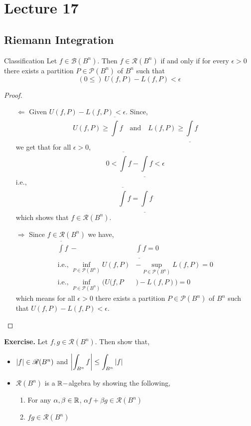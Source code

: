 \documentclass[../Analysis-3.tex]{subfiles}
\begin{document}
\chapter*{Lecture 17} %
\setcounter{chapter}{17} %
\setcounter{section}{0}

\section{Riemann Integration}

\begin{Thm}{Classification}{}
  Let $ f \in \mathscr{B}(B^n) $. Then $ f \in \mathscr{R}(B^n) $ if and only if for every $ \epsilon > 0 $ there exists a partition $ P \in \mathscr{P}(B^n) $ of $ B^n $ such that
  \[  (0 \leq) \ U(f,P) - L(f,P) < \epsilon  \]
\end{Thm}

\begin{proof}
  \begin{itemize}
    \item[$ \Longleftarrow $] Given $ U(f,P) - L(f,P) < \epsilon $. Since,
      \[ U(f,P) \geq \overline{\int} f \quad \text{and} \quad L(f,P) \geq \underline{\int} f \]
      we get that for all $ \epsilon > 0 $,
      \[  0 < \overline{\int}f - \underline{\int}f < \epsilon  \]
      i.e.,
      \[  \overline{\int}f = \underline{\int}f  \]
      which shows that $ f \in \mathscr{R}(B^n) $.
    \item[$ \Longrightarrow $] Since $ f \in \mathscr{R}(B^n) $ we have,
      \begin{align*}
        \overline{\int}f \ - \                                    & \underline{\int}f = 0                      \\
        \text{i.e.,  } \inf_{P \in \mathscr{P}(B^n)} U(f,P)       & - \sup_{P \in \mathscr{P}(B^n)} L(f,P) = 0 \\
        \text{i.e.,  } \inf_{P \in \mathscr{P}(B^n)} \Big( U(f, P & ) - L(f,P) \Big) = 0
      \end{align*}
      which means for all $ \epsilon > 0 $ there exists a partition $ P \in \mathscr{P}(B^n) $ of $ B^n $ such that $ U(f,P) - L(f,P) < \epsilon $.
  \end{itemize}
\end{proof}

\textbf{Exercise.} Let $ f,g \in \mathscr{R}(B^n) $. Then show that,
\begin{itemize}
  \item $ \abs{f} \in \mathscr{R}(B^n) $ and $ \displaystyle \abs{\int_{B^n} f} \leq \int_{B^n} \abs{f} $
  \item  $ \mathscr{R}(B^n) $ is a $\mathbb{R}-$algebra by showing the following, \begin{enumerate}[label = (\roman*)]
          \item For any $ \alpha, \beta \in \mathbb{R} $,  $ \alpha f + \beta g \in \mathscr{R}(B^n) $
          \item $ fg \in \mathscr{R}(B^n) $
        \end{enumerate}
\end{itemize}
\end{document}
